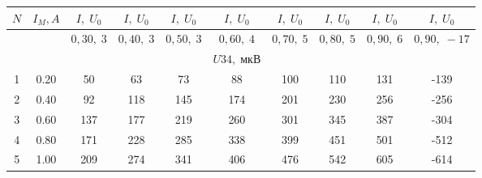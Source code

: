 \documentclass[12pt,a4paper]{article}
\begin{document}
\begin{enumerate}
\begin{table}[]
\begin{tabular}{|c|cccccccc|c|}
\hline
$ N $ & \multicolumn{1}{c|}{$ I_M, A $} & \multicolumn{1}{c|}{$I, \; U_0 $} & \multicolumn{1}{c|}{$I, \;U_0 $}    & \multicolumn{1}{c|}{$I, \;U_0 $}   & \multicolumn{1}{c|}{$I, \;U_0 $}    & \multicolumn{1}{c|}{$I, \;U_0 $}   & \multicolumn{1}{c|}{$I, \;U_0 $}   & $I, \;U_0 $     & $I, \;U_0 $     \\ \hline
      & \multicolumn{1}{c|}{}           & \multicolumn{1}{c|}{$0,30,  \;3$} & \multicolumn{1}{c|}{$ 0,40,  \;3 $} & \multicolumn{1}{c|}{$  0,50, \;3$} & \multicolumn{1}{c|}{$  0,60,  \;4$} & \multicolumn{1}{c|}{$ 0,70,  \;5$} & \multicolumn{1}{c|}{$ 0,80, \; 5$} & $  0,90,  \;6 $ & $ 0,90,\; -17 $ \\ \hline
      &                                 &                                   &                                     &                                    & $ U34, \; мкВ $                     &                                    &                                    &                 &                 \\ \hline
1     & \multicolumn{1}{c|}{0.20}       & \multicolumn{1}{c|}{50}           & \multicolumn{1}{c|}{63}             & \multicolumn{1}{c|}{73}            & \multicolumn{1}{c|}{88}             & \multicolumn{1}{c|}{100}           & \multicolumn{1}{c|}{110}           & 131             & -139            \\ \hline
2     & \multicolumn{1}{c|}{0.40}       & \multicolumn{1}{c|}{92}           & \multicolumn{1}{c|}{118}            & \multicolumn{1}{c|}{145}           & \multicolumn{1}{c|}{174}            & \multicolumn{1}{c|}{201}           & \multicolumn{1}{c|}{230}           & 256             & -256            \\ \hline
3     & \multicolumn{1}{c|}{0.60}       & \multicolumn{1}{c|}{137}          & \multicolumn{1}{c|}{177}            & \multicolumn{1}{c|}{219}           & \multicolumn{1}{c|}{260}            & \multicolumn{1}{c|}{301}           & \multicolumn{1}{c|}{345}           & 387             & -304            \\ \hline
4     & \multicolumn{1}{c|}{0.80}       & \multicolumn{1}{c|}{171}          & \multicolumn{1}{c|}{228}            & \multicolumn{1}{c|}{285}           & \multicolumn{1}{c|}{338}            & \multicolumn{1}{c|}{399}           & \multicolumn{1}{c|}{451}           & 501             & -512            \\ \hline
5     & \multicolumn{1}{c|}{1.00}       & \multicolumn{1}{c|}{209}          & \multicolumn{1}{c|}{274}            & \multicolumn{1}{c|}{341}           & \multicolumn{1}{c|}{406}            & \multicolumn{1}{c|}{476}           & \multicolumn{1}{c|}{542}           & 605             & -614            \\ \hline

\end{tabular}
\end{table}
\end{enumerate}
\end{document}
